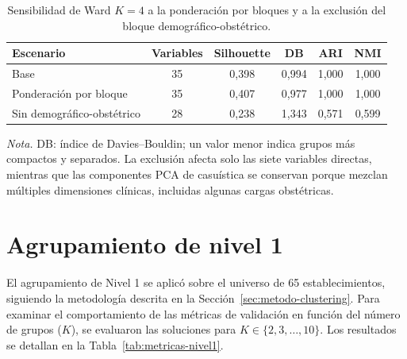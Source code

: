 \begin{table}[htbp]
\centering
\caption{Sensibilidad de Ward $K=4$ a la ponderación por bloques y a la exclusión del bloque demográfico-obstétrico.}
\label{tab:sensibilidad-bloques}

\begin{tabular}{l c c c c c}
\toprule
\textbf{Escenario} & \textbf{Variables} & \textbf{Silhouette} &
\textbf{DB} & \textbf{ARI} & \textbf{NMI} \\
\midrule
Base & 35 & 0,398 & 0,994 & 1,000 & 1,000 \\
Ponderación por bloque & 35 & 0,407 & 0,977 & 1,000 & 1,000 \\
Sin demográfico-obstétrico & 28 & 0,238 & 1,343 & 0,571 & 0,599 \\
\bottomrule
\end{tabular}
\par\smallskip
\begin{minipage}{\textwidth}
\normalsize\raggedright
\textit{Nota.} DB: índice de Davies--Bouldin; un valor menor indica grupos más
compactos y separados. La exclusión afecta solo las siete variables directas,
mientras que las componentes PCA de casuística se conservan porque mezclan múltiples
dimensiones clínicas, incluidas algunas cargas obstétricas.
\end{minipage}
\end{table}

\section{Agrupamiento de nivel 1}
\label{sec:nivel1}

El agrupamiento de Nivel 1 se aplicó sobre el universo de 65 establecimientos,
siguiendo la metodología descrita en la
Sección~\ref{sec:metodo-clustering}. Para examinar el comportamiento de las
métricas de validación en función del número de grupos ($K$), se evaluaron las
soluciones para $K \in \{2, 3, \ldots, 10\}$. Los resultados se detallan en la
Tabla~\ref{tab:metricas-nivel1}.

